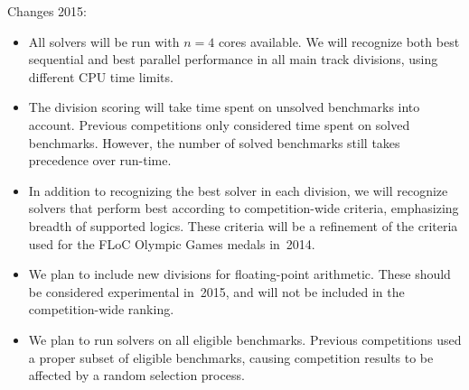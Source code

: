 \documentclass[twoside,11pt]{article}
\begin{document}
\begin{tjark}
Changes 2015:
\begin{itemize}
\item All solvers will be run with $n=4$ cores available.  We will
  recognize both best sequential and best parallel performance in all
  main track divisions, using different CPU time limits.
\item The division scoring will take time spent on unsolved benchmarks
  into account.  Previous competitions only considered time spent on
  solved benchmarks.  However, the number of solved benchmarks still
  takes precedence over run-time.
\item In addition to recognizing the best solver in each division, we
  will recognize solvers that perform best according to
  competition-wide criteria, emphasizing breadth of supported logics.
  These criteria will be a refinement of the criteria used for the
  FLoC Olympic Games medals in~2014.
\item We plan to include new divisions for floating-point arithmetic.
  These should be considered experimental in~2015, and will not be
  included in the competition-wide ranking.
\item We plan to run solvers on all eligible benchmarks.  Previous
  competitions used a proper subset of eligible benchmarks, causing
  competition results to be affected by a random selection process.
\end{itemize}


\end{tjark}
\end{document}
